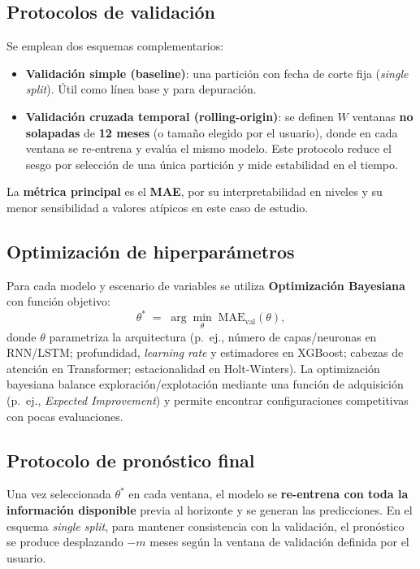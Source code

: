 \documentclass[12pt,letterpaper]{article}
\begin{document}
\subsection{Protocolos de validación}
Se emplean dos esquemas complementarios:
\begin{itemize}
    \item \textbf{Validación simple (baseline)}: una partición con fecha de corte fija (\textit{single split}). Útil como línea base y para depuración.
    \item \textbf{Validación cruzada temporal (rolling-origin)}: se definen \(W\) ventanas \textbf{no solapadas} de \textbf{12 meses} (o tamaño elegido por el usuario), donde en cada ventana se re-entrena y evalúa el mismo modelo. Este protocolo reduce el sesgo por selección de una única partición y mide estabilidad en el tiempo.
\end{itemize}
La \textbf{métrica principal} es el \textbf{MAE}, por su interpretabilidad en niveles y su menor sensibilidad a valores atípicos en este caso de estudio.

\subsection{Optimización de hiperparámetros}
Para cada modelo y escenario de variables se utiliza \textbf{Optimización Bayesiana} con función objetivo:
\[
\theta^* \;=\; \arg\min_{\theta} \; \text{MAE}_{\text{val}}(\theta),
\]
donde \(\theta\) parametriza la arquitectura (p.~ej., número de capas/neuronas en RNN/LSTM; profundidad, \textit{learning rate} y estimadores en XGBoost; cabezas de atención en Transformer; estacionalidad en Holt-Winters). La optimización bayesiana balance exploración/explotación mediante una función de adquisición (p.~ej., \textit{Expected Improvement}) y permite encontrar configuraciones competitivas con pocas evaluaciones.

\subsection{Protocolo de pronóstico final}
Una vez seleccionada \(\theta^*\) en cada ventana, el modelo se \textbf{re-entrena con toda la información disponible} previa al horizonte y se generan las predicciones. En el esquema \textit{single split}, para mantener consistencia con la validación, el pronóstico se produce desplazando \(-m\) meses según la ventana de validación definida por el usuario.
\end{document}
